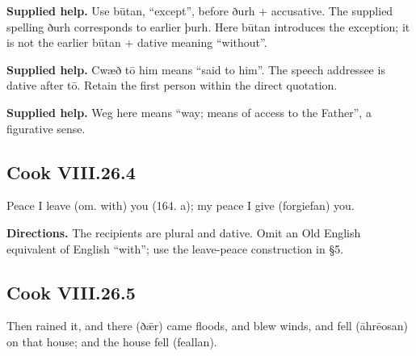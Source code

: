 \textbf{Supplied help.} Use būtan, “except”, before ðurh + accusative. The supplied spelling ðurh corresponds to earlier þurh. Here būtan introduces the exception; it is not the earlier būtan + dative meaning “without”.

\textbf{Supplied help.} Cwæð tō him means “said to him”. The speech addressee is dative after tō. Retain the first person within the direct quotation.

\textbf{Supplied help.} Weg here means “way; means of access to the Father”, a figurative sense.

\par\begin{minipage}{\linewidth}\raggedright
\subsection*{Cook VIII.26.4}

Peace I leave (om. with) you (164. a); my peace I give (forgiefan) you.

\textbf{Directions.} The recipients are plural and dative. Omit an Old English equivalent of English “with”; use the leave-peace construction in §5.

\end{minipage}\par\addvspace{4pt}

\par\begin{minipage}{\linewidth}\raggedright
\subsection*{Cook VIII.26.5}

Then rained it, and there (ðǣr) came floods, and blew winds, and fell (āhrēosan) on that house; and the house fell (feallan).

\end{minipage}\par\addvspace{4pt}

